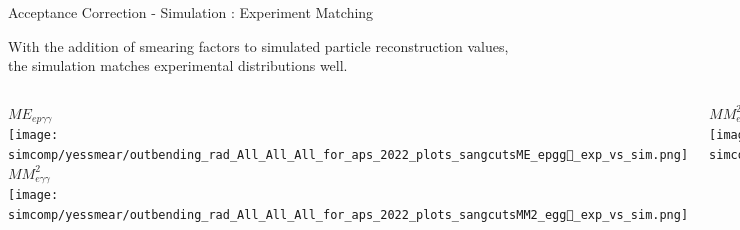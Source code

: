 \documentclass[aspectratio=169]{beamer}
\newcommand*{\myfont}{\fontfamily{lmtt}\selectfont}
\begin{document}
\begin{frame}{Acceptance Correction - Simulation : Experiment Matching}

With the addition of smearing factors to simulated particle reconstruction values, the simulation matches experimental distributions well.  {\myfont{\footnotesize [Collaborator S. Lee]}}




\vspace{0.2cm}
\begin{columns}
                     \centering $ME_{ep\gamma\gamma}$ \\
                   	\texttt{[image: simcomp/yessmear/outbending\_rad\_All\_All\_All\_for\_aps\_2022\_plots\_sangcutsME\_epgg\_exp\_vs\_sim.png]}
                   	   \centering  $MM^2_{e\gamma\gamma}$ \\
                	\texttt{[image: simcomp/yessmear/outbending\_rad\_All\_All\_All\_for\_aps\_2022\_plots\_sangcutsMM2\_egg\_exp\_vs\_sim.png]}


     
                       \centering  $MM^2_{ep\gamma\gamma}$ \\
                	\texttt{[image: simcomp/yessmear/outbending\_rad\_All\_All\_All\_for\_aps\_2022\_plots\_sangcutsMM2\_epgg\_exp\_vs\_sim.png]}
   
                      \centering   $MM^2_{ep}$ \\
                	\texttt{[image: simcomp/yessmear/outbending\_rad\_All\_All\_All\_for\_aps\_2022\_plots\_sangcutsMM2\_ep\_exp\_vs\_sim.png]}

            

                      \centering   $M_{\gamma\gamma}$ \\
                	\texttt{[image: simcomp/yessmear/outbending\_rad\_All\_All\_All\_for\_aps\_2022\_plots\_sangcutsMpi0\_exp\_vs\_sim.png]}
 
                       \centering  $\Delta p_{t}$ \\
                	\texttt{[image: simcomp/yessmear/outbending\_rad\_All\_All\_All\_for\_aps\_2022\_plots\_sangcutsMPt\_exp\_vs\_sim.png]}

    \end{columns}
\end{frame} 
\end{document}
